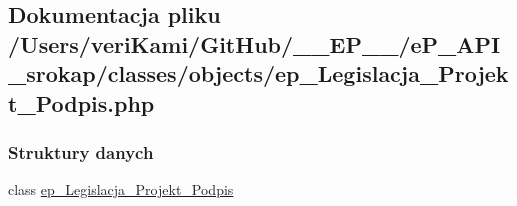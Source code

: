 \hypertarget{ep___legislacja___projekt___podpis_8php}{\subsection{Dokumentacja pliku /\-Users/veri\-Kami/\-Git\-Hub/\-\_\-\-\_\-\-E\-P\-\_\-\-\_\-/e\-P\-\_\-\-A\-P\-I\-\_\-srokap/classes/objects/ep\-\_\-\-Legislacja\-\_\-\-Projekt\-\_\-\-Podpis.php}
\label{ep___legislacja___projekt___podpis_8php}
}
\subsubsection*{Struktury danych}
\begin{DoxyCompactItemize}
\item 
class \hyperlink{classep___legislacja___projekt___podpis}{ep\-\_\-\-Legislacja\-\_\-\-Projekt\-\_\-\-Podpis}
\end{DoxyCompactItemize}
